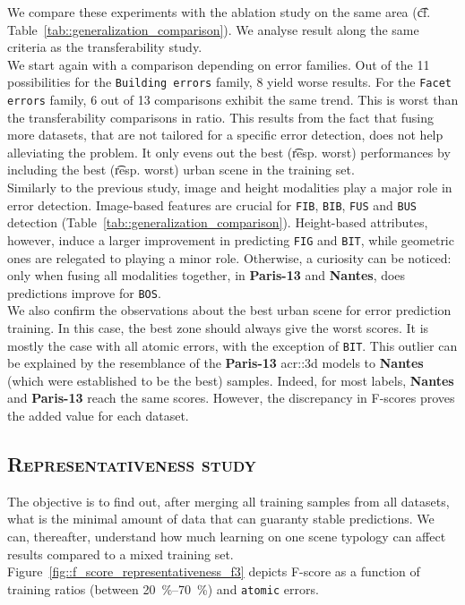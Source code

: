         We compare these experiments with the ablation study on the same area (\t{cf.} Table~\ref{tab::generalization_comparison}).
        We analyse result along the same criteria as the transferability study.\\
    
        We start again with a comparison depending on error families.
        Out of the 11 possibilities for the \texttt{Building errors} family, 8 yield worse results.
        For the \texttt{Facet errors} family, 6 out of 13 comparisons exhibit the same trend.
        This is worst than the transferability comparisons in ratio.
        This results from the fact that fusing more datasets, that are not tailored for a specific error detection, does not help alleviating the problem.
        It only evens out the best (\t{resp.} worst) performances by including the best (\t{resp.} worst) urban scene in the training set.\\
        
        Similarly to the previous study, image and height modalities play a major role in error detection.
        Image-based features are crucial for \texttt{FIB}, \texttt{BIB}, \texttt{FUS} and \texttt{BUS} detection (Table~\ref{tab::generalization_comparison}).
        Height-based attributes, however, induce a larger improvement in predicting \texttt{FIG} and \texttt{BIT}, while geometric ones are relegated to playing a minor role.
        Otherwise, a curiosity can be noticed: only when fusing all modalities together, in \textbf{Paris-13} and \textbf{Nantes}, does predictions improve for \texttt{BOS}.\\
        
        We also confirm the observations about the best urban scene for error prediction training.
        In this case, the best zone should always give the worst scores.
        It is mostly the case with all atomic errors, with the exception of \texttt{BIT}.
        This outlier can be explained by the resemblance of the \textbf{Paris-13} \gls{acr::3d} models to \textbf{Nantes} (which were established to be the best) samples.
        Indeed, for most labels, \textbf{Nantes} and \textbf{Paris-13} reach the same scores.
        However, the discrepancy in F-scores proves the added value for each dataset.
    
    \subsection{\textsc{Representativeness study}}
        \label{subsec::more_experiments::scalability::representativeness}
        The objective is to find out, after merging all training samples from all datasets, what is the minimal amount of data that can guaranty stable predictions.
        We can, thereafter, understand how much learning on one scene typology can affect results compared to a mixed training set.
        Figure~\ref{fig::f_score_representativeness_f3} depicts F-score as a function of training ratios (between \SIrange[range-phrase={ and }]{20}{70}{\percent}) and \texttt{atomic} errors.\\
                
